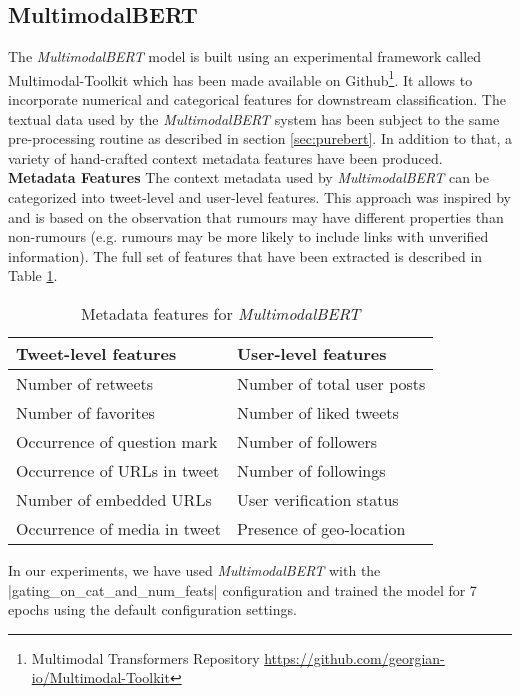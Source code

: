 \documentclass[11pt,a4paper]{article}
\begin{document}
\subsection{MultimodalBERT}
The \textit{MultimodalBERT} model is built using an experimental framework called Multimodal-Toolkit which has been made available on Github\footnote{Multimodal Transformers Repository \url{https://github.com/georgian-io/Multimodal-Toolkit}}. It allows to incorporate numerical and categorical features for downstream classification. 
\newline
The textual data used by the \textit{MultimodalBERT} system has been subject to the same pre-processing routine as described in section \ref{sec:purebert}. In addition to that, a variety of hand-crafted context metadata features have been produced. 
\newline
\newline
\textbf{Metadata Features}
\newline
The context metadata used by \textit{MultimodalBERT} can be categorized into tweet-level and user-level features. This approach was inspired by \cite{RN668} and is based on the observation that rumours may have different properties than non-rumours (e.g. rumours may be more likely to include links with unverified information). The full set of features that have been extracted is described in Table \ref{tbl:handcrafted_features}.
\begin{table}
\small
\setlength\tabcolsep{2pt}
\begin{tabularx}{0.48\textwidth}{XX}
\hline 
\textbf{Tweet-level features} &\textbf{User-level features}\\ \hline
Number of retweets & Number of total user posts\\
Number of favorites & Number of liked tweets \\
Occurrence of question mark & Number of followers\\
Occurrence of URLs in tweet & Number of followings \\
Number of embedded URLs & User verification status \\
Occurrence of media in tweet & Presence of geo-location \\
\hline
\end{tabularx}
\caption{Metadata features for \textit{MultimodalBERT}}
\label{tbl:handcrafted_features} 
\end{table}
In our experiments, we have used \textit{MultimodalBERT} with the \spverb|gating_on_cat_and_num_feats| configuration and trained the model for 7 epochs using the default configuration settings.
\end{document}
